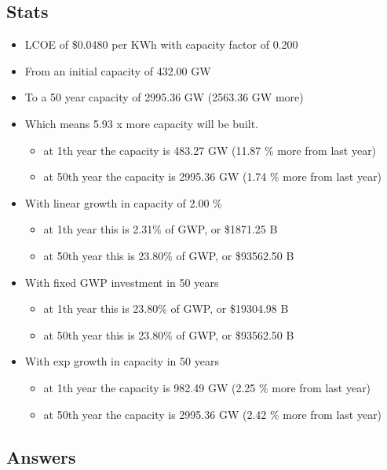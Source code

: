 \documentclass[11pt]{article}
\providecommand{\tightlist}{%
  \setlength{\itemsep}{0pt}\setlength{\parskip}{0pt}}
\begin{document}
\subsection{Stats}
\begin{itemize}
\tightlist
\item
  LCOE of \$0.0480 per KWh with capacity factor of 0.200
\item
  From an initial capacity of 432.00 GW
\item
  To a 50 year capacity of 2995.36 GW (2563.36 GW more)
\item
  Which means 5.93 x more capacity will be built.

  \begin{itemize}
  \tightlist
  \item
    at 1th year the capacity is 483.27 GW (11.87 \% more from last year)
  \item
    at 50th year the capacity is 2995.36 GW (1.74 \% more from last
    year)
  \end{itemize}
\item
  With linear growth in capacity of 2.00 \%

  \begin{itemize}
  \tightlist
  \item
    at 1th year this is 2.31\% of GWP, or \$1871.25 B
  \item
    at 50th year this is 23.80\% of GWP, or \$93562.50 B
  \end{itemize}
\item
  With fixed GWP investment in 50 years

  \begin{itemize}
  \tightlist
  \item
    at 1th year this is 23.80\% of GWP, or \$19304.98 B
  \item
    at 50th year this is 23.80\% of GWP, or \$93562.50 B
  \end{itemize}
\item
  With exp growth in capacity in 50 years

  \begin{itemize}
  \tightlist
  \item
    at 1th year the capacity is 982.49 GW (2.25 \% more from last year)
  \item
    at 50th year the capacity is 2995.36 GW (2.42 \% more from last
    year)
  \end{itemize}
\end{itemize}
\subsection{Answers}
\end{document}
